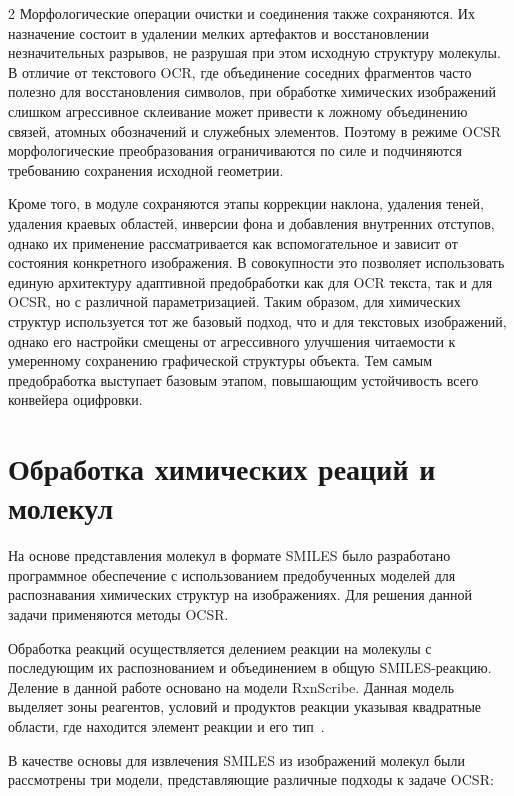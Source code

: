 \documentclass[11pt]{article}
\begin{document}
\begin{multicols}{2}
Морфологические операции очистки и соединения также сохраняются. Их назначение состоит в удалении мелких артефактов и восстановлении незначительных разрывов, не разрушая при этом исходную структуру молекулы. В отличие от текстового OCR, где объединение соседних фрагментов часто полезно для восстановления символов, при обработке химических изображений слишком агрессивное склеивание может привести к ложному объединению связей, атомных обозначений и служебных элементов. Поэтому в режиме OCSR морфологические преобразования ограничиваются по силе и подчиняются требованию сохранения исходной геометрии.

Кроме того, в модуле сохраняются этапы коррекции наклона, удаления теней, удаления краевых областей, инверсии фона и добавления внутренних отступов, однако их применение рассматривается как вспомогательное и зависит от состояния конкретного изображения. В совокупности это позволяет использовать единую архитектуру адаптивной предобработки как для OCR текста, так и для OCSR, но с различной параметризацией. Таким образом, для химических структур используется тот же базовый подход, что и для текстовых изображений, однако его настройки смещены от агрессивного улучшения читаемости к умеренному сохранению графической структуры объекта. 
Тем самым предобработка выступает базовым этапом, повышающим устойчивость всего конвейера оцифровки. 
\section{Обработка химических реаций и молекул}
На основе представления молекул в формате SMILES было разработано программное обеспечение с использованием предобученных моделей для распознавания химических структур на изображениях. Для решения данной задачи применяются методы OCSR. 

Обработка реакций осуществляется делением реакции на молекулы с последующим их распознованием и объединением в общую SMILES-реакцию. Деление в данной работе основано на модели RxnScribe. Данная модель выделяет зоны реагентов, условий и продуктов реакции указывая квадратные области, где находится элемент реакции и его тип~\cite{refLlava}.

В качестве основы для извлечения SMILES из изображений молекул были рассмотрены три модели, представляющие различные подходы к задаче OCSR:




\end{multicols}
\end{document}
